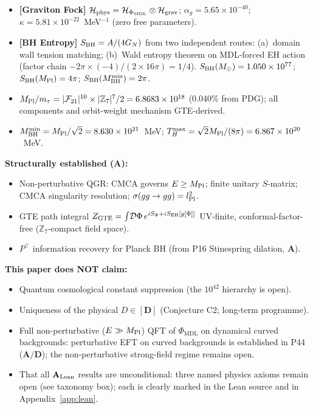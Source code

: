 \documentclass[11pt]{article}
\theoremstyle{remark}
\newcommand{\GTE}{\text{GTE}}
\newcommand{\PHIMDL}{\Phi_{\mathrm{MDL}}}
\newcommand{\ZS}{\mathbb{Z}_7}
\newcommand{\epsz}{\varepsilon_0}
\newcommand{\MPltot}{M_{\rm Pl}^{\GTE}}
\newcommand{\FTT}{\mathcal{F}_{21}}
\newcommand{\CatA}{\textbf{A}}
\newcommand{\CatAL}{\ensuremath{\textbf{A}_{\rm Lean}}}
\newcommand{\CatAD}{\textbf{A/D}}
\begin{document}
\begin{tcolorbox}[colback=orange!6,colframe=orange!70!black,
  title={\textbf{What this paper claims and does not claim}},
  fonttitle=\bfseries,left=6pt,right=6pt,top=5pt,bottom=5pt]
\begin{itemize}[noitemsep,topsep=2pt]
        where $\epsz(\MPltot)=1$);
        $M_{\rm Pl}^{\rm GTE} = 1.2204\times10^{19}$~GeV ($0.040\%$ from PDG).
  \item \textbf{[Graviton Fock]} $\mathcal{H}_{\rm phys}=\mathcal{H}_{\PHIMDL}\otimes
        \mathcal{H}_{\rm grav}$; $\alpha_g=5.65\times10^{-40}$; $\kappa=5.81\times10^{-22}$~MeV$^{-1}$
        (zero free parameters).
  \item \textbf{[BH Entropy]} $S_{\rm BH}=A/(4G_N)$ from two independent routes:
        (a)~domain wall tension matching; (b)~Wald entropy theorem on MDL-forced EH action
        (factor chain $-2\pi\times(-4)/(2\times16\pi)=1/4$).
        $S_{\rm BH}(M_\odot)=1.050\times10^{77}$; $S_{\rm BH}(M_{\rm Pl})=4\pi$;
        $S_{\rm BH}(M_{\rm BH}^{\rm min})=2\pi$.
  \item $M_{\rm Pl}/m_\tau = |\FTT|^{10} \times |\ZS|^7/2 = 6.8683\times10^{18}$
        (0.040\% from PDG); all components and orbit-weight mechanism GTE-derived.
  \item $M_{\rm BH}^{\rm min}=M_{\rm Pl}/\sqrt{2}=8.630\times10^{21}$~MeV;
        $T_H^{\rm max}=\sqrt{2}M_{\rm Pl}/(8\pi)=6.867\times10^{20}$~MeV.
\end{itemize}
\textbf{Structurally established ($\CatA$):}
\begin{itemize}[noitemsep,topsep=2pt]
  \item Non-perturbative QGR: CMCA governs $E\geq M_{\rm Pl}$; finite unitary $S$-matrix;
        CMCA singularity resolution; $\sigma(gg\to gg)=l_{\rm Pl}^2$.
  \item GTE path integral $Z_{\rm GTE}=\int\!\mathcal{D}\Phi\,e^{iS_\Phi+iS_{\rm EH}[g[\Phi]]}$
        UV-finite, conformal-factor-free ($\ZS$-compact field space).
  \item $P^\top$ information recovery for Planck BH (from P16 Stinespring dilation, $\CatA$).
\end{itemize}
\textbf{This paper does NOT claim:}
\begin{itemize}[noitemsep,topsep=2pt]
  \item Quantum cosmological constant suppression (the $10^{42}$ hierarchy is open).
  \item Uniqueness of the physical $D\in[\mathbf{D}]$ (Conjecture C2; long-term programme).
  \item Full non-perturbative ($E\gg M_{\rm Pl}$) QFT of $\PHIMDL$ on
        dynamical curved backgrounds: perturbative EFT on curved backgrounds
        is established in P44~\cite{SpivackQGR} ($\CatAD$); the
        non-perturbative strong-field regime remains open.
  \item That all $\CatAL$ results are unconditional: three named physics axioms remain
    open (see taxonomy box); each is clearly marked in the Lean source and in
    Appendix~\ref{app:lean}.
\end{itemize}
\end{tcolorbox}
\end{document}
